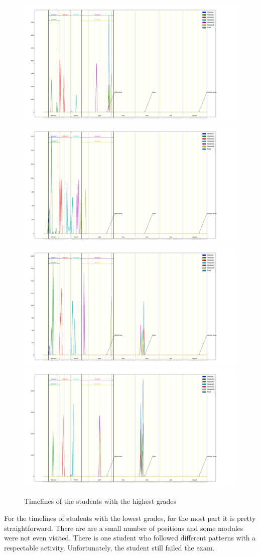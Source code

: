 \documentclass[a4paper,11pt]{report}
\numberwithin{figure}{chapter} %
\begin{document}
      \begin{figure}[H]
      \centering
  	  \includegraphics[width=.48\linewidth]{images/good_timeline_1747564.png}
  	  \includegraphics[width=.48\linewidth]{images/good_timeline_1793969.png}
      \\
      \includegraphics[width=.48\linewidth]{images/good_timeline_1942114.png}
      \includegraphics[width=.48\linewidth]{images/good_timeline_3554348.png}
      \caption{Timelines of the students with the highest grades}
      \label{fig:tm2}
      \end{figure}

    For the timelines of students with the lowest grades, for the most part it is pretty straightforward.
    There are are a small number of positions and some modules were not even visited.
    There is one student who followed different patterns with a respectable activity.
    Unfortunately, the student still failed the exam.\\
\end{document}
